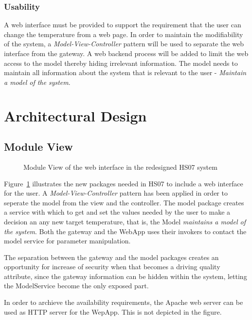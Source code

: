 \documentclass[a4paper,10pt]{article}
\begin{document}
\subsubsection{Usability}
A web interface must be provided to support the requirement that the user can change the temperature from a web page. In order to maintain the modifiability of the system, a \emph{Model-View-Controller} pattern will be used to separate the web interface from the gateway. A web backend process will be added to limit the web access to the model thereby hiding irrelevant information. The model needs to maintain all information about the system that is relevant to the user - \emph{Maintain a model of the system}.


\section{Architectural Design}

\subsection{Module View}

\begin{figure}[!htb]
\centerline{}
\caption{Module View of the web interface in the redesigned HS07 system}
\label{fig:mv-model}
\end{figure}
Figure~\ref{fig:mv-model} illustrates the new packages needed in HS07 to include a web interface for the user. A \emph{Model-View-Controller} pattern has been applied in order to seperate the model from the view and the controller. The model package creates a service with which to get and set the values needed by the user to make a decision an any new target temperature, that is, the Model \emph{maintains a model of the system}. Both the gateway and the WebApp uses their invokers to contact the model service for parameter manipulation.

The separation between the gateway and the model packages creates an opportunity for increase of security when that becomes a driving quality attribute, since the gateway information can be hidden within the system, letting the ModelService become the only exposed part.

In order to archieve the availability requirements, the Apache web server can be used as HTTP server for the WepApp. This is not depicted in the figure.
\end{document}
